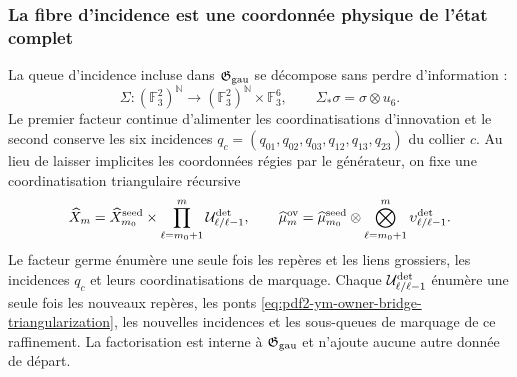 \subsubsection{La fibre d’incidence est une coordonnée physique de l’état complet}

La queue d’incidence incluse dans $\mathfrak G_{\rm gau}$ se décompose sans perdre
d’information :
\begin{equation}\label{eq:pdf2-ym-owner-seed-split}
 \Sigma:(\mathbb F_3^2)^{\mathbb N}\longrightarrow
 (\mathbb F_3^2)^{\mathbb N}\times\mathbb F_3^6,
 \qquad \Sigma_*\sigma=\sigma\otimes u_6.
\end{equation}
Le premier facteur continue d'alimenter les coordinatisations d'innovation et le second conserve les six incidences $q_c=(q_{01},q_{02},q_{03},q_{12},q_{13},q_{23})$ du collier $c$. Au lieu de laisser implicites les coordonnées régies par le générateur, on fixe une coordinatisation triangulaire récursive
\begin{equation}\label{eq:pdf2-ym-owner-product-factorization}
 \widehat X_m
 =\widehat X_{m_0}^{\rm seed}
  \times\prod_{\ell=m_0+1}^{m}
       \mathcal U_{\ell/\ell-1}^{\rm det},
 \qquad
 \widehat\mu_m^{\rm ov}
 =\widehat\mu_{m_0}^{\rm seed}
  \otimes\bigotimes_{\ell=m_0+1}^{m}
       \upsilon_{\ell/\ell-1}^{\rm det}.
\end{equation}
Le facteur germe énumère une seule fois les repères et les liens grossiers, les incidences $q_c$ et leurs coordinatisations de marquage. Chaque $\mathcal U_{\ell/\ell-1}^{\rm det}$ énumère une seule fois les nouveaux repères, les ponts \eqref{eq:pdf2-ym-owner-bridge-triangularization}, les nouvelles incidences et les sous-queues de marquage de ce raffinement. La factorisation est interne à $\mathfrak G_{\rm gau}$ et n'ajoute aucune autre donnée de départ.

